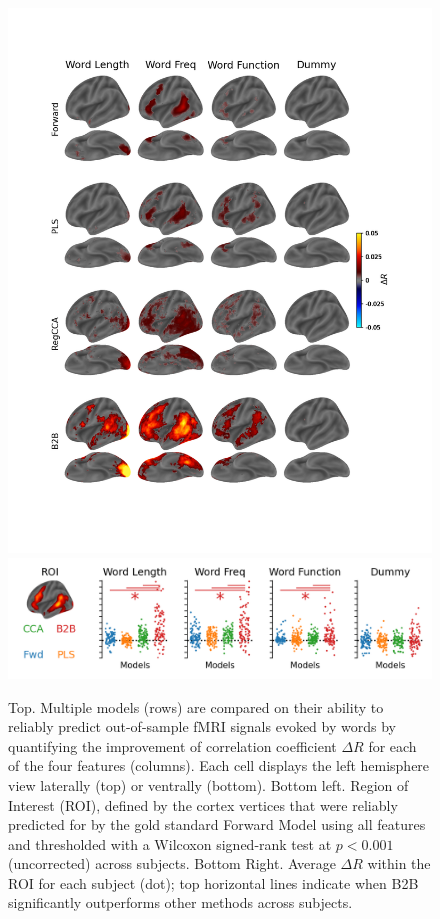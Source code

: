 \begin{figure}
  \begin{center}
          \includegraphics[width=.8\textwidth,
                       trim=1cm 1cm 1cm 2cm,
                       clip=True]{figures/fmri_delta_r.png}
          \includegraphics[width=.8\textwidth,
                       trim=0cm 0cm 0cm 0cm,
                       clip=True]{figures/fmri_strip.png}

      \label{fig:fmri_delta_r}
  \end{center}
  \caption{Top. Multiple models (rows) are compared on their ability to
  reliably predict out-of-sample fMRI signals evoked by words by quantifying
  the improvement of correlation coefficient $\Delta R$ for each of the four
  features (columns). Each cell displays the left hemisphere view laterally
  (top) or ventrally (bottom). Bottom left. Region
  of Interest (ROI), defined by the cortex vertices that were reliably
  predicted for by the gold standard Forward Model using all features and
  thresholded with a Wilcoxon signed-rank test at $p<0.001$ (uncorrected) across subjects. Bottom
  Right. Average $\Delta R$ within the ROI for each subject
  (dot); top horizontal lines indicate when B2B significantly outperforms
  other methods across subjects.}
\end{figure}


